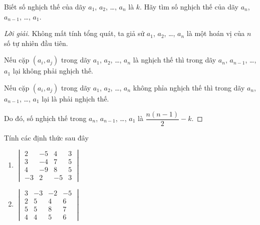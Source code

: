\begin{exercise}
    Biết số nghịch thế của dãy $a_{1}$, $a_{2}$, \ldots, $a_{n}$ là $k$. Hãy tìm số nghịch thế của dãy $a_{n}$, $a_{n-1}$, \ldots, $a_{1}$.
\end{exercise}

\begin{proof}[Lời giải]
    Không mất tính tổng quát, ta giả sử $a_{1}$, $a_{2}$, \ldots, $a_{n}$ là một hoán vị của $n$ số tự nhiên đầu tiên.
    
    Nếu cặp $(a_{i}, a_{j})$ trong dãy $a_{1}$, $a_{2}$, \ldots, $a_{n}$ là nghịch thế thì trong dãy $a_{n}$, $a_{n-1}$, \ldots, $a_{1}$ lại không phải nghịch thế.
    
    Nếu cặp $(a_{i}, a_{j})$ trong dãy $a_{1}$, $a_{2}$, \ldots, $a_{n}$ không phỉa nghịch thế thì trong dãy $a_{n}$, $a_{n-1}$, \ldots, $a_{1}$ lại là phải nghịch thế.
    
    Do đó, số nghịch thế trong $a_{n}$, $a_{n-1}$, \ldots, $a_{1}$ là $\dfrac{n(n-1)}{2} - k$.
\end{proof}

\begin{exercise}
    Tính các định thức sau đây
    \begin{enumerate}[label = (\alph*)]
        \item $
                  \begin{vmatrix}
                      2  & -5 & 4  & 3 \\
                      3  & -4 & 7  & 5 \\
                      4  & -9 & 8  & 5 \\
                      -3 & 2  & -5 & 3
                  \end{vmatrix}
              $
        \item $
                  \begin{vmatrix}
                      3 & -3 & -2 & -5 \\
                      2 & 5  & 4  & 6  \\
                      5 & 5  & 8  & 7  \\
                      4 & 4  & 5  & 6
                  \end{vmatrix}
              $
    \end{enumerate}
\end{exercise}

